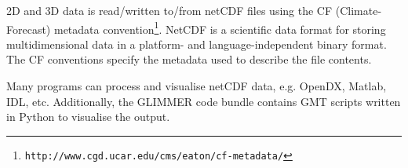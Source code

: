2D and 3D data is read/written to/from netCDF files using the CF (Climate-Forecast) metadata convention\footnote{\texttt{http://www.cgd.ucar.edu/cms/eaton/cf-metadata/}}. NetCDF is a scientific data format for storing multidimensional data in a platform- and language-independent binary format. The CF conventions specify the metadata used to describe the file contents.

Many programs can process and visualise netCDF data, e.g. OpenDX, Matlab, IDL, etc. Additionally, the GLIMMER code bundle contains GMT scripts written in Python to visualise the output.

